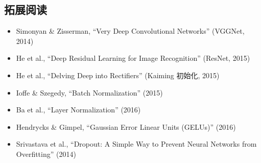 \subsection{拓展阅读}

\begin{itemize}
    \item Simonyan \& Zisserman, ``Very Deep Convolutional Networks'' (VGGNet, 2014)
    \item He et al., ``Deep Residual Learning for Image Recognition'' (ResNet, 2015)
    \item He et al., ``Delving Deep into Rectifiers'' (Kaiming 初始化, 2015)
    \item Ioffe \& Szegedy, ``Batch Normalization'' (2015)
    \item Ba et al., ``Layer Normalization'' (2016)
    \item Hendrycks \& Gimpel, ``Gaussian Error Linear Units (GELUs)'' (2016)
    \item Srivastava et al., ``Dropout: A Simple Way to Prevent Neural Networks from Overfitting'' (2014)
\end{itemize}


